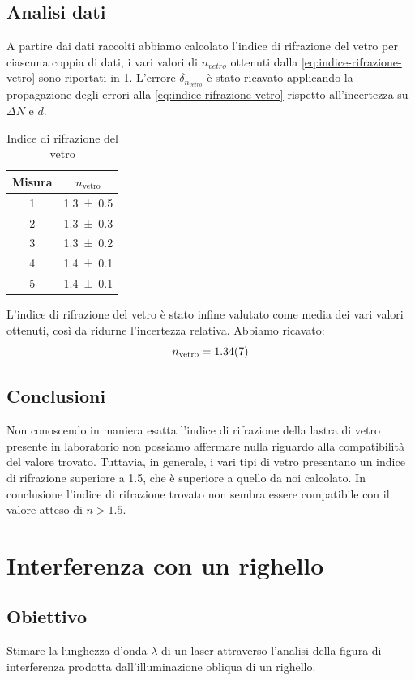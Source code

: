 \documentclass[a4paper]{article}
\begin{document}
\subsection{Analisi dati}
A partire dai dati raccolti abbiamo calcolato l'indice di rifrazione del vetro per ciascuna coppia di dati, i vari valori di $n_{vetro}$ ottenuti dalla \cref{eq:indice-rifrazione-vetro} sono riportati in \cref{tab:indice-rifrazione-vetro}. L'errore $\delta_{n_{vetro}}$ è stato ricavato applicando la propagazione degli errori alla \cref{eq:indice-rifrazione-vetro} rispetto all'incertezza su $\Delta N$ e $d$.
\begin{table}[htbp]
\centering
\caption{Indice di rifrazione del vetro}
\label{tab:indice-rifrazione-vetro}
\begin{tabular}{cc}
\toprule
\textbf{Misura} & $n_{\text{vetro}}$ \\
\midrule
1 & \num{1.3 \pm 0.5} \\
2 & \num{1.3 \pm 0.3} \\
3 & \num{1.3 \pm 0.2} \\
4 & \num{1.4 \pm 0.1} \\
5 & \num{1.4 \pm 0.1} \\
\bottomrule
\end{tabular}
\end{table}

L'indice di rifrazione del vetro è stato infine valutato come media dei vari valori ottenuti, così da ridurne l'incertezza relativa. Abbiamo ricavato:
\begin{equation}
    n_{\text{vetro}} = \num{1.34 \pm 0.07}
\end{equation}

\subsection{Conclusioni}
Non conoscendo in maniera esatta l'indice di rifrazione della lastra di vetro presente in laboratorio non possiamo affermare nulla riguardo alla compatibilità del valore trovato. Tuttavia, in generale, i vari tipi di vetro presentano un indice di rifrazione superiore a \num{1.5}, che è superiore a quello da noi calcolato. In conclusione l'indice di rifrazione trovato non sembra essere compatibile con il valore atteso di $n>\num{1.5}$. 

\section{Interferenza con un righello}
\subsection{Obiettivo}
Stimare la lunghezza d'onda $\lambda$ di un laser attraverso l'analisi della figura di interferenza prodotta dall'illuminazione obliqua di un righello. 
\end{document}
